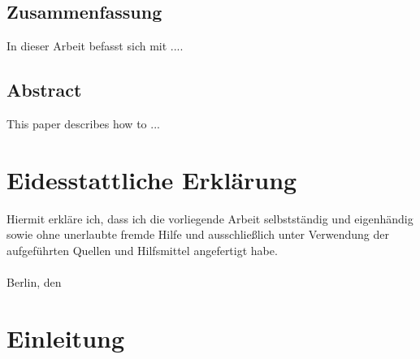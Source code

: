 \makeatother

\newcommand\ProcessThreeDashes{\llap{\color{cyan}\mdseries-{-}-}}




    \nocite{*}



    \frontmatter
    
    \hypersetup{pageanchor=false}

    \newpage
    \section*{Zusammenfassung}
    In dieser Arbeit befasst sich mit ....

    \section*{Abstract}\label{sec:abstract}
    This paper describes how to ...
    \newpage
    \chapter*{Eidesstattliche Erklärung}\label{ch:eidesstattliche-erklarung}
    Hiermit erkläre ich, dass ich die vorliegende Arbeit selbstständig und eigenhändig sowie ohne
    unerlaubte fremde Hilfe und ausschließlich unter Verwendung der aufgeführten Quellen und
    Hilfsmittel angefertigt habe.\\
    \vspace{1cm}\\
    Berlin, den \underline{\hspace{3cm}} \hfill \DeinName \underline{\hspace{4cm}}

    \newpage
    \tableofcontents

    \mainmatter

    \newpage
    \chapter{Einleitung}\label{ch:einleitung}

